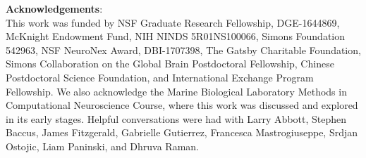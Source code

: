 \documentclass[11pt]{article}
\begin{document}
%
%
%


\textbf{Acknowledgements}: \\
This work was funded by NSF Graduate Research Fellowship,  DGE-1644869, McKnight Endowment Fund, NIH NINDS 5R01NS100066, Simons Foundation 542963, NSF NeuroNex Award, DBI-1707398, The Gatsby Charitable Foundation, Simons Collaboration on the Global Brain Postdoctoral Fellowship, Chinese Postdoctoral Science Foundation, and International Exchange Program Fellowship. 
We also acknowledge the Marine Biological Laboratory Methods in Computational Neuroscience Course, where this work was discussed and explored in its early stages.
Helpful conversations were had with Larry Abbott, Stephen Baccus,  James Fitzgerald, Gabrielle Gutierrez,  Francesca Mastrogiuseppe, Srdjan Ostojic, Liam Paninski, and Dhruva Raman.
\end{document}
